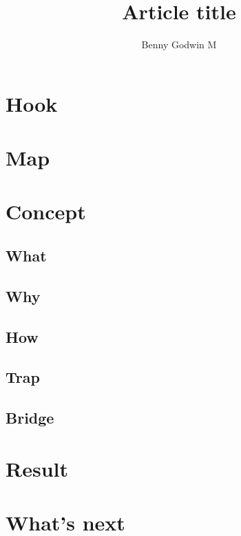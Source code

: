 \documentclass[11pt]{article}
\title{Article title}
\author{Benny Godwin M}
\begin{document}
\maketitle

\section{Hook}
\section{Map}
\section{Concept}
\subsection*{What} \subsection*{Why} \subsection*{How} \subsection*{Trap} \subsection*{Bridge}
\section{Result}
\section{What's next}
\end{document}
